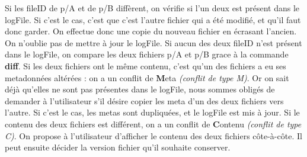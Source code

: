\documentclass[a4paper,12pt]{report}
\begin{document}
\begin{onehalfspace}
				Si les fileID de p/A et de p/B diffèrent, on vérifie si l'un deux est présent dans le logFile. Si c'est le cas, c'est que c'est l'autre fichier qui a été modifié, et qu'il faut donc garder. On effectue donc une copie du nouveau fichier en écrasant l'ancien. On n'oublie pas de mettre à jour le logFile.
				Si aucun des deux fileID n'est présent dans le logFile, on compare les deux fichiers p/A et p/B grace à la commande \textbf{diff}. Si les deux fichiers ont le même contenu, c'est qu'un des fichiers a eu ses metadonnées altérées : on a un conflit de \textbf{M}eta \textit{(conflit de type M)}. Or on sait déjà qu'elles ne sont pas présentes dans le logFile, nous sommes obligés de demander à l'utilisateur s'il désire copier les meta d'un des deux fichiers vers l'autre. Si c'est le cas, les metas sont dupliquées, et le logFile est mis à jour.
				Si le contenu des deux fichiers est différent, on a un conflit de \textbf{C}ontenu \textit{(conflit de type C)}. On propose à l'utilisateur d'afficher le contenu des deux fichiers côte-à-côte. Il peut ensuite décider la version fichier qu'il souhaite conserver.
			\end{onehalfspace}
			\clearpage
\end{document}
